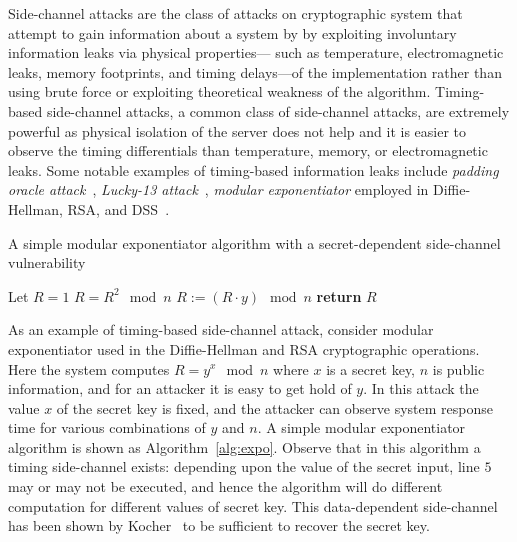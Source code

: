 Side-channel attacks are the class of attacks on cryptographic system that
attempt to gain information about a system by by exploiting involuntary
information leaks via physical properties---
such as temperature, electromagnetic leaks, memory footprints, and timing
delays---of the implementation rather than using brute force or exploiting
theoretical weakness of the algorithm.
Timing-based side-channel attacks, a common class of
side-channel attacks, are extremely powerful as physical isolation of the
server does not help and it is easier to observe the timing differentials than
temperature, memory, or electromagnetic leaks.  
Some notable examples of timing-based information leaks include \emph{padding oracle
attack}~\cite{Vau02}, \emph{Lucky-13 attack}~\cite{al2013lucky},  \emph{modular
exponentiator} employed in Diffie-Hellman, RSA, and DSS~\cite{kocher96}.

\begin{algorithm}[t]
  \caption{A simple modular exponentiator algorithm with a secret-dependent side-channel vulnerability}
  \label{alg:expo}
  \begin{algorithmic}[1]
    \State  Let $R = 1$
    \State  $R = R^2 \mod n$
    \State  $R := (R \cdot y) \mod n$
    \EndIf
    \EndFor
    \State \textbf{return} $R$
  \end{algorithmic}
\end{algorithm}

As an example of timing-based side-channel attack, consider modular
exponentiator used in the Diffie-Hellman and RSA cryptographic operations.
Here the system computes $R = y^x \mod n$ where $x$ is a secret key, $n$ is
public information, and for an attacker it is easy to get hold of $y$.
In this attack the value $x$ of the secret key is fixed, and the attacker can
observe system response time for various combinations of $y$ and $n$.
A simple modular exponentiator algorithm is shown as Algorithm~\ref{alg:expo}.
Observe that in this algorithm a timing side-channel exists: depending upon
the value of the secret input, line $5$ may or may not be executed, and hence
the algorithm will do different computation for different values of secret key.
This data-dependent side-channel has been shown by Kocher~\cite{kocher96} to be sufficient to recover the secret key.


